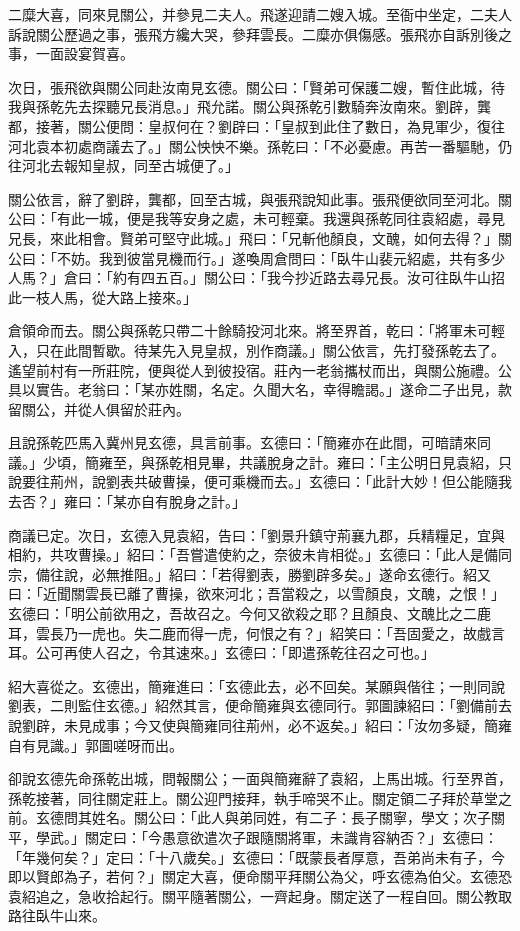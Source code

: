 二糜大喜，同來見關公，并參見二夫人。飛遂迎請二嫂入城。至衙中坐定，二夫人訴說關公歷過之事，張飛方纔大哭，參拜雲長。二糜亦俱傷感。張飛亦自訴別後之事，一面設宴賀喜。

次日，張飛欲與關公同赴汝南見玄德。關公曰：「賢弟可保護二嫂，暫住此城，待我與孫乾先去探聽兄長消息。」飛允諾。關公與孫乾引數騎奔汝南來。劉辟，龔都，接著，關公便問：皇叔何在？劉辟曰：「皇叔到此住了數日，為見軍少，復往河北袁本初處商議去了。」關公怏怏不樂。孫乾曰：「不必憂慮。再苦一番驅馳，仍往河北去報知皇叔，同至古城便了。」

關公依言，辭了劉辟，龔都，回至古城，與張飛說知此事。張飛便欲同至河北。關公曰：「有此一城，便是我等安身之處，未可輕棄。我還與孫乾同往袁紹處，尋見兄長，來此相會。賢弟可堅守此城。」飛曰：「兄斬他顏良，文醜，如何去得？」關公曰：「不妨。我到彼當見機而行。」遂喚周倉問曰：「臥牛山裴元紹處，共有多少人馬？」倉曰：「約有四五百。」關公曰：「我今抄近路去尋兄長。汝可往臥牛山招此一枝人馬，從大路上接來。」

倉領命而去。關公與孫乾只帶二十餘騎投河北來。將至界首，乾曰：「將軍未可輕入，只在此間暫歇。待某先入見皇叔，別作商議。」關公依言，先打發孫乾去了。遙望前村有一所莊院，便與從人到彼投宿。莊內一老翁攜杖而出，與關公施禮。公具以實告。老翁曰：「某亦姓關，名定。久聞大名，幸得瞻謁。」遂命二子出見，款留關公，并從人俱留於莊內。

且說孫乾匹馬入冀州見玄德，具言前事。玄德曰：「簡雍亦在此間，可暗請來同議。」少頃，簡雍至，與孫乾相見畢，共議脫身之計。雍曰：「主公明日見袁紹，只說要往荊州，說劉表共破曹操，便可乘機而去。」玄德曰：「此計大妙！但公能隨我去否？」雍曰：「某亦自有脫身之計。」

商議已定。次日，玄德入見袁紹，告曰：「劉景升鎮守荊襄九郡，兵精糧足，宜與相約，共攻曹操。」紹曰：「吾嘗遣使約之，奈彼未肯相從。」玄德曰：「此人是備同宗，備往說，必無推阻。」紹曰：「若得劉表，勝劉辟多矣。」遂命玄德行。紹又曰：「近聞關雲長已離了曹操，欲來河北；吾當殺之，以雪顏良，文醜，之恨！」玄德曰：「明公前欲用之，吾故召之。今何又欲殺之耶？且顏良、文醜比之二鹿耳，雲長乃一虎也。失二鹿而得一虎，何恨之有？」紹笑曰：「吾固愛之，故戲言耳。公可再使人召之，令其速來。」玄德曰：「即遣孫乾往召之可也。」

紹大喜從之。玄德出，簡雍進曰：「玄德此去，必不回矣。某願與偕往；一則同說劉表，二則監住玄德。」紹然其言，便命簡雍與玄德同行。郭圖諫紹曰：「劉備前去說劉辟，未見成事；今又使與簡雍同往荊州，必不返矣。」紹曰：「汝勿多疑，簡雍自有見識。」郭圖嗟呀而出。

卻說玄德先命孫乾出城，問報關公；一面與簡雍辭了袁紹，上馬出城。行至界首，孫乾接著，同往關定莊上。關公迎門接拜，執手啼哭不止。關定領二子拜於草堂之前。玄德問其姓名。關公曰：「此人與弟同姓，有二子：長子關寧，學文；次子關平，學武。」關定曰：「今愚意欲遣次子跟隨關將軍，未識肯容納否？」玄德曰：「年幾何矣？」定曰：「十八歲矣。」玄德曰：「既蒙長者厚意，吾弟尚未有子，今即以賢郎為子，若何？」關定大喜，便命關平拜關公為父，呼玄德為伯父。玄德恐袁紹追之，急收拾起行。關平隨著關公，一齊起身。關定送了一程自回。關公教取路往臥牛山來。

